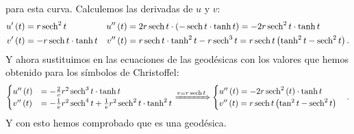 para esta curva. Calculemos las derivadas de $u$ y $v$:
\begin{align*}
    u'\left( t \right) &= r \operatorname{sech}^2 t & u''\left( t \right) &= 2 r
    \operatorname{sech} t \cdot \left( - \operatorname{sech} t \cdot \tanh t \right) = -2 r \operatorname{sech}^2 t \cdot
    \tanh t\\
    v'\left( t \right) &= -r \operatorname{sech} t \cdot \tanh t & v''\left( t \right) &= r
    \operatorname{sech} t \cdot \tanh^2 t - r \operatorname{sech}^3 t = r\operatorname{sech} t \left( \tanh^2 t - \operatorname{sech}^2
    t \right).
\end{align*}
Y ahora sustituimos en las ecuaciones de las geodésicas con los valores que
hemos obtenido para los símbolos de Christoffel:
\[
\begin{cases}
    u''\left( t \right) &= -\frac{2}{v}r^2 \operatorname{sech}^3 t \cdot \tanh t\\
    v''\left( t \right) &= -\frac{1}{v} r^2 \operatorname{sech}^4 t + \frac{1}{v} r^2 \operatorname{sech}^2 t
    \cdot \tanh^2 t
\end{cases} \xRightarrow{v = r \operatorname{sech}t} \begin{cases}
    u''\left( t \right) = -2 r \operatorname{sech}^2 \left( t \right) \cdot \tanh t\\
    v''\left( t \right) = r \operatorname{sech} t \left( \tan^2 t - \operatorname{sech}^2 t \right)
\end{cases}.
\]
Y con esto hemos comprobado que es una geodésica.
